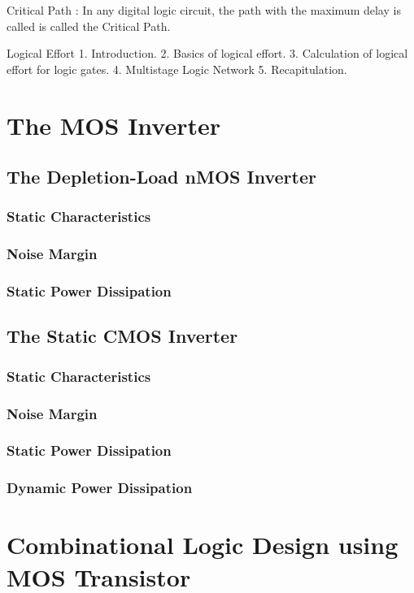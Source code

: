 \documentclass[12pt, letterpaper]{article}
\begin{document}
Critical Path : In any digital logic circuit, the path with the maximum delay is called is called the Critical Path.

									Logical Effort
1. Introduction.
2. Basics of logical effort.
3. Calculation of logical effort for logic gates.
4. Multistage Logic Network
5. Recapitulation. 




\section{The MOS Inverter}
\subsection{The Depletion-Load nMOS Inverter}
\subsubsection{Static Characteristics}
\subsubsection{Noise Margin}
\subsubsection{Static Power Dissipation}

\subsection{The Static CMOS Inverter}
\subsubsection{Static Characteristics}
\subsubsection{Noise Margin}
\subsubsection{Static Power Dissipation}
\subsubsection{Dynamic Power Dissipation}

\section{Combinational Logic Design using MOS Transistor}
\end{document}
